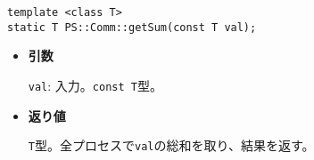 \begin{screen}
\begin{verbatim}
template <class T>
static T PS::Comm::getSum(const T val);
\end{verbatim}
\end{screen}

\begin{itemize}

\item{{\bf 引数}}

{\tt val}: 入力。{\tt const T}型。

\item{{\bf 返り値}}

{\tt T}型。全プロセスで{\tt val}の総和を取り、結果を返す。

\end{itemize}











